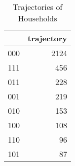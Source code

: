 \begin{table}
\centering
\caption{Trajectories of Households}
\label{tbl:Trajectories}
\begin{tabular}{lr}
\toprule
{} &  trajectory \\
\midrule
000 &        2124 \\
111 &         456 \\
011 &         228 \\
001 &         219 \\
010 &         153 \\
100 &         108 \\
110 &          96 \\
101 &          87 \\
\bottomrule
\end{tabular}
\end{table}
